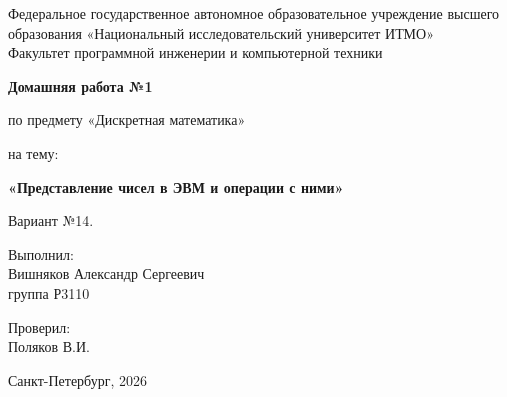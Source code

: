 \documentclass[12pt,a4paper]{extarticle}
\begin{document}
\begin{titlepage}
    \begin{center}
        Федеральное государственное автономное образовательное учреждение высшего образования «Национальный исследовательский университет ИТМО»\\
        Факультет программной инженерии и компьютерной техники

        \vfill

        \textbf{Домашняя работа №1}

        по предмету «Дискретная математика»

        на тему:

        \textbf{«Представление чисел в ЭВМ и операции с ними»}

        Вариант №14.
        \vfill
    \end{center}

    \begin{flushright}
        Выполнил:\\
        Вишняков Александр Сергеевич\\
        группа Р3110
        
        \vspace{0.5cm}

        Проверил:\\
        Поляков В.И.
    \end{flushright}

    \vfill

    \begin{center}
        Санкт-Петербург, 2026
    \end{center}
\end{titlepage}

\tableofcontents
\clearpage






\end{document}
